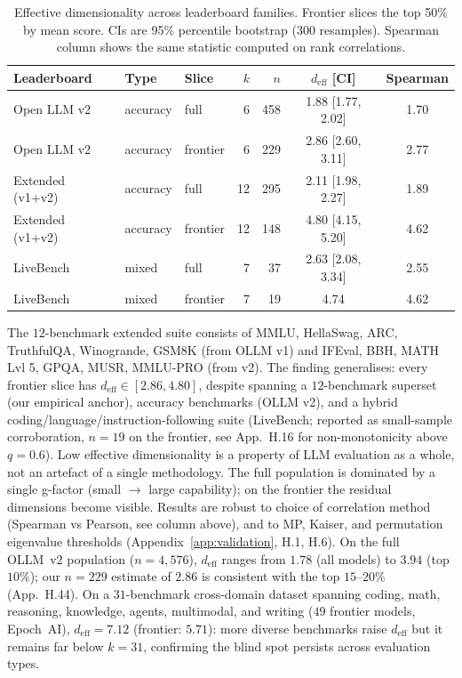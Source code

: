 \documentclass{article}
\begin{document}
\begin{table}[t]
\small\centering
\caption{Effective dimensionality across leaderboard families. Frontier
slices the top 50\% by mean score. CIs are 95\% percentile bootstrap
($300$ resamples). Spearman column shows the same statistic computed
on rank correlations.}
\label{tab:cross}
\begin{tabular}{lllrrcc}
\toprule
Leaderboard & Type & Slice & $k$ & $n$ & $d_{\mathrm{eff}}$ [CI] & Spearman \\
\midrule
Open LLM v2     & accuracy & full      &  6 & 458 & 1.88 [1.77, 2.02] & 1.70 \\
Open LLM v2     & accuracy & frontier  &  6 & 229 & 2.86 [2.60, 3.11] & 2.77 \\
Extended (v1+v2)& accuracy & full      & 12 & 295 & 2.11 [1.98, 2.27] & 1.89 \\
Extended (v1+v2)& accuracy & frontier  & 12 & 148 & 4.80 [4.15, 5.20] & 4.62 \\
LiveBench       & mixed    & full      &  7 &  37 & 2.63 [2.08, 3.34] & 2.55 \\
LiveBench       & mixed    & frontier  &  7 &  19 & 4.74              & 4.62 \\
\bottomrule
\end{tabular}
\end{table}

\noindent The $12$-benchmark extended suite consists of MMLU,
HellaSwag, ARC, TruthfulQA, Winogrande, GSM8K (from OLLM v1) and
IFEval, BBH, MATH Lvl 5, GPQA, MUSR, MMLU-PRO (from v2). The finding
generalises: every frontier slice has $d_{\mathrm{eff}} \in [2.86,
4.80]$, despite spanning a $12$-benchmark superset (our empirical
anchor), accuracy benchmarks (OLLM v2), and a hybrid
coding/language/instruction-following suite (LiveBench; reported as
small-sample corroboration, $n = 19$ on the frontier, see
App.~H.16 for non-monotonicity above $q = 0.6$). Low effective
dimensionality is a property of LLM evaluation as a whole, not an
artefact of a single methodology. The full population is dominated by
a single g-factor (small $\to$ large capability); on the frontier the
residual dimensions become visible. Results are robust to choice of
correlation method (Spearman vs Pearson, see column above), and to MP,
Kaiser, and permutation eigenvalue thresholds
(Appendix~\ref{app:validation}, H.1, H.6). On the full OLLM~v2 population ($n = 4{,}576$),
$d_{\mathrm{eff}}$ ranges from $1.78$ (all models) to $3.94$ (top
$10\%$); our $n = 229$ estimate of $2.86$ is consistent with the top
$15$--$20\%$ (App.~H.44). On a $31$-benchmark cross-domain dataset
spanning coding, math, reasoning, knowledge, agents, multimodal, and
writing ($49$ frontier models, Epoch~AI), $d_{\mathrm{eff}} = 7.12$
(frontier: $5.71$): more diverse benchmarks raise
$d_{\mathrm{eff}}$ but it remains far below $k = 31$, confirming
the blind spot persists across evaluation types.
\end{document}
